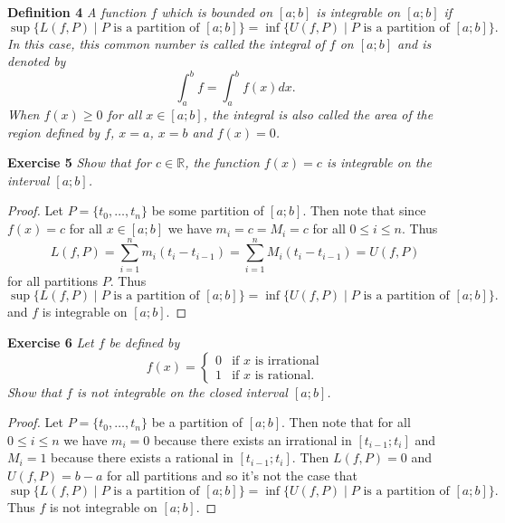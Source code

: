 \documentclass{article}
\begin{document}
\begin{flushleft}
\textbf{Definition 4}
\textsl{A function $f$ which is bounded on $[a;b]$ is integrable on $[a;b]$ if
\[
\sup \{L(f,P) \mid \text{$P$ is a partition of $[a;b]$} \} = \inf \{U(f,P) \mid \text{$P$ is a partition of $[a;b]$} \}.
\]
In this case, this common number is called the integral of $f$ on $[a;b]$ and is denoted by
\[
\int_a^b f = \int_a^b f(x) dx.
\]
When $f(x) \geq 0$ for all $x \in [a;b]$, the integral is also called the area of the region defined by $f$, $x=a$, $x=b$ and $f(x) = 0$.}\newline

\textbf{Exercise 5}
\textsl{Show that for $c \in \mathbb{R}$, the function $f(x) = c$ is integrable on the interval $[a;b]$.}
\begin{proof}
Let $P = \{t_0, \dots , t_n\}$ be some partition of $[a;b]$. Then note that since $f(x) = c$ for all $x \in [a;b]$ we have $m_i = c = M_i = c$ for all $0 \leq i \leq n$. Thus
\[
L(f,P) = \sum_{i=1}^n m_i (t_i-t_{i-1}) = \sum_{i=1}^n M_i (t_i-t_{i-1}) = U(f,P)
\]
for all partitions $P$. Thus
\[
\sup \{L(f,P) \mid \text{$P$ is a partition of $[a;b]$} \} = \inf \{U(f,P) \mid \text{$P$ is a partition of $[a;b]$} \}.
\]
and $f$ is integrable on $[a;b]$.
\end{proof}

\textbf{Exercise 6}
\textsl{Let $f$ be defined by
\[
f(x) =
\begin{cases}
0 & \text{if $x$ is irrational}\\
1 & \text{if $x$ is rational}.
\end{cases}
\]
Show that $f$ is not integrable on the closed interval $[a;b]$.}
\begin{proof}
Let $P = \{t_0, \dots , t_n\}$ be a partition of $[a;b]$. Then note that for all $0 \leq i \leq n$ we have $m_i = 0$ because there exists an irrational in $[t_{i-1}; t_i]$ and $M_i = 1$ because there exists a rational in $[t_{i-1}; t_i]$. Then $L(f,P) = 0$ and $U(f,P) = b-a$ for all partitions and so it's not the case that
\[
\sup \{L(f,P) \mid \text{$P$ is a partition of $[a;b]$} \} = \inf \{U(f,P) \mid \text{$P$ is a partition of $[a;b]$} \}.
\]
Thus $f$ is not integrable on $[a;b]$.
\end{proof}


\end{flushleft}
\end{document}
